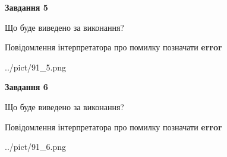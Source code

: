 \documentclass[12pt, ukrainian]{article}
\begin{document}
{{\begin {center}\textbf{Завдання 5}\end {center}}\par
Що буде виведено за виконання? \par
Повідомлення інтерпретатора про помилку позначати \textbf{error}

\begin{center}
	{../pict/91_5.png}
\end{center}
\newpage

{\begin {center}\textbf{Завдання 6}\end {center}}\par
Що буде виведено за виконання? \par
Повідомлення інтерпретатора про помилку позначати \textbf{error}

\begin{center}
	{../pict/91_6.png}
\end{center}
\newpage

}
\end{document}
